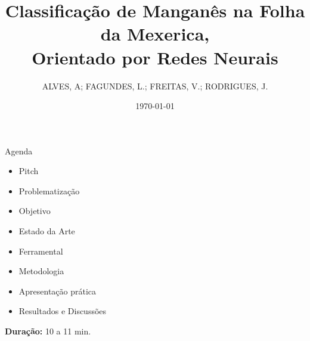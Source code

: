 \documentclass[aspectratio=169]{beamer}
\title{Classificação de Manganês na Folha da Mexerica, \\ Orientado por Redes Neurais}
\subtitle{}
\author[DSM]{ALVES, A; FAGUNDES, L.; FREITAS, V.; RODRIGUES, J.}
\institute{Desenvolvimento de Software Multiplataforma\\FATEC Registro}
\date{\today}
\begin{document}
\begin{frame}
  \vspace{0.8cm}
  \begin{center}
    
    \vspace{0.4cm}
    
    {\normalsize\bfseries\inserttitle}\par
    
    \vspace{0.2cm}
    
    {\tiny\insertauthor}\par
    
    \vspace{0.1cm}
    
    {\small\textcolor{azulComplementar}{\insertsubtitle}}\par
    
    \vspace{0.5cm}
    
    
    \vspace{0.3cm}
    
    {\scriptsize\insertinstitute}\par
    
    \vspace{0.01cm}
    
    {\tiny\textcolor{azulComplementar}{\insertdate}}\par
  \end{center}
\end{frame}

\begin{frame}[b]{Agenda}
  \begin{itemize}
    \item Pitch
    \item Problematização
    \item Objetivo
    \item Estado da Arte
    \item Ferramental
    \item Metodologia
    \item Apresentação prática
    \item Resultados e Discussões
  \end{itemize}
  
  \vfill
  
  \hfill{\scriptsize \textbf{Duração:} 10 a 11 min.}
\end{frame}
\end{document}
